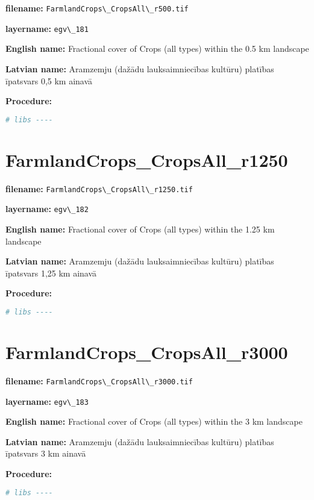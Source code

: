 \documentclass[
]{book}
\newcommand{\passthrough}[1]{#1}
\begin{document}
\textbf{filename:} \passthrough{\lstinline!FarmlandCrops\_CropsAll\_r500.tif!}

\textbf{layername:} \passthrough{\lstinline!egv\_181!}

\textbf{English name:} Fractional cover of Crops (all types) within the 0.5 km landscape

\textbf{Latvian name:} Aramzemju (dažādu lauksaimniecības kultūru) platības īpatsvars 0,5 km ainavā

\textbf{Procedure:}

\begin{lstlisting}[language=R]
# libs ----
\end{lstlisting}

\section{FarmlandCrops\_CropsAll\_r1250}\label{ch06.182}

\textbf{filename:} \passthrough{\lstinline!FarmlandCrops\_CropsAll\_r1250.tif!}

\textbf{layername:} \passthrough{\lstinline!egv\_182!}

\textbf{English name:} Fractional cover of Crops (all types) within the 1.25 km landscape

\textbf{Latvian name:} Aramzemju (dažādu lauksaimniecības kultūru) platības īpatsvars 1,25 km ainavā

\textbf{Procedure:}

\begin{lstlisting}[language=R]
# libs ----
\end{lstlisting}

\section{FarmlandCrops\_CropsAll\_r3000}\label{ch06.183}

\textbf{filename:} \passthrough{\lstinline!FarmlandCrops\_CropsAll\_r3000.tif!}

\textbf{layername:} \passthrough{\lstinline!egv\_183!}

\textbf{English name:} Fractional cover of Crops (all types) within the 3 km landscape

\textbf{Latvian name:} Aramzemju (dažādu lauksaimniecības kultūru) platības īpatsvars 3 km ainavā

\textbf{Procedure:}

\begin{lstlisting}[language=R]
# libs ----
\end{lstlisting}
\end{document}
